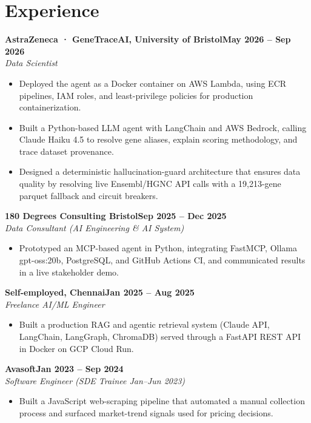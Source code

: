 \documentclass[a4paper,10pt]{article}
\newcommand{\entry}[4]{\noindent\textbf{#1}\hfill\textbf{#2}\\ \textit{#3}\hfill\textit{#4}\par}
\begin{document}
\section{Experience}
\entry{AstraZeneca · GeneTraceAI, University of Bristol}{May 2026 – Sep 2026}{Data Scientist}{}
\begin{itemize}
  \item Deployed the agent as a Docker container on AWS Lambda, using ECR pipelines, IAM roles, and least-privilege policies for production containerization.
  \item Built a Python-based LLM agent with LangChain and AWS Bedrock, calling Claude Haiku 4.5 to resolve gene aliases, explain scoring methodology, and trace dataset provenance.
  \item Designed a deterministic hallucination-guard architecture that ensures data quality by resolving live Ensembl/HGNC API calls with a 19,213-gene parquet fallback and circuit breakers.
\end{itemize}
\vspace{3pt}
\entry{180 Degrees Consulting Bristol}{Sep 2025 – Dec 2025}{Data Consultant (AI Engineering \& AI System)}{}
\begin{itemize}
  \item Prototyped an MCP-based agent in Python, integrating FastMCP, Ollama gpt-oss:20b, PostgreSQL, and GitHub Actions CI, and communicated results in a live stakeholder demo.
\end{itemize}
\vspace{3pt}
\entry{Self-employed, Chennai}{Jan 2025 – Aug 2025}{Freelance AI/ML Engineer}{}
\begin{itemize}
  \item Built a production RAG and agentic retrieval system (Claude API, LangChain, LangGraph, ChromaDB) served through a FastAPI REST API in Docker on GCP Cloud Run.
\end{itemize}
\vspace{3pt}
\entry{Avasoft}{Jan 2023 – Sep 2024}{Software Engineer (SDE Trainee Jan–Jun 2023)}{}
\begin{itemize}
  \item Built a JavaScript web-scraping pipeline that automated a manual collection process and surfaced market-trend signals used for pricing decisions.
\end{itemize}

\end{document}
